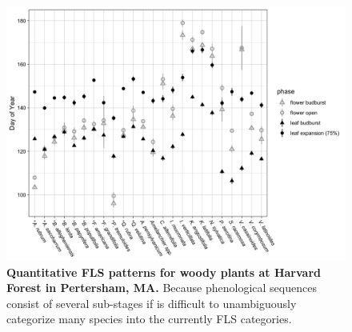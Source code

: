\documentclass{article}\usepackage[]{graphicx}\usepackage[]{color}
\begin{document}
{\begin{figure}[h!]
    \centering
 \includegraphics[width=\textwidth]{..//HarvardForest/HFmeans_expanded.jpeg} 
    \caption{\textbf{Quantitative FLS patterns for woody plants at Harvard Forest in Pertersham, MA.} Because phenological sequences consist of several sub-stages if is difficult to unambiguously categorize many species into the currently FLS categories. }
    \label{fig:HFmeans}
\end{figure}

}
\end{document}
